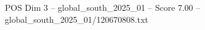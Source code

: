 \begin{textsample}{POS Dim 3 – global\_south\_2025\_01 – Score 7.00 – global\_south\_2025\_01/120670808.txt}
\end{textsample}
